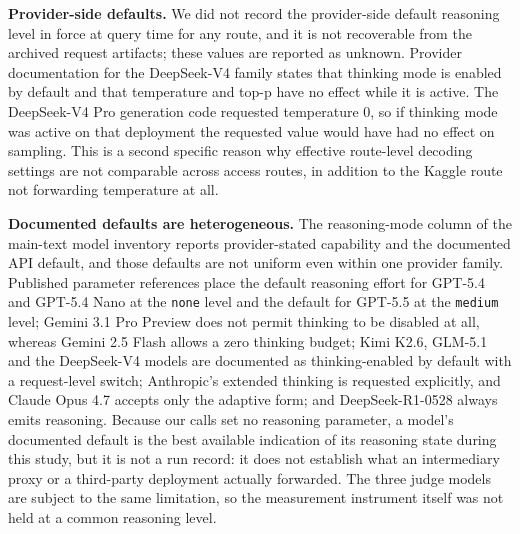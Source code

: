 \documentclass[10pt]{article}
\begin{document}
\textbf{Provider-side defaults.} We did not record the provider-side default reasoning
level in force at query time for any route, and it is not recoverable from the archived
request artifacts; these values are reported as unknown. Provider documentation for the
DeepSeek-V4 family states that thinking mode is enabled by default and that temperature
and top-p have no effect while it is active. The DeepSeek-V4 Pro generation code
requested temperature 0, so if thinking mode was active on that deployment the requested
value would have had no effect on sampling. This is a second specific reason why
effective route-level decoding settings are not comparable across access routes, in
addition to the Kaggle route not forwarding temperature at all.

\textbf{Documented defaults are heterogeneous.} The reasoning-mode column of the main-text
model inventory reports provider-stated capability and the documented API default, and
those defaults are not uniform even within one provider family. Published parameter
references place the default reasoning effort for GPT-5.4 and GPT-5.4 Nano at the
\texttt{none} level and the default for GPT-5.5 at the \texttt{medium} level; Gemini 3.1
Pro Preview does not permit thinking to be disabled at all, whereas Gemini 2.5 Flash
allows a zero thinking budget; Kimi K2.6, GLM-5.1 and the DeepSeek-V4 models are
documented as thinking-enabled by default with a request-level switch; Anthropic's
extended thinking is requested explicitly, and Claude Opus 4.7 accepts only the adaptive
form; and DeepSeek-R1-0528 always emits reasoning. Because our calls set no reasoning
parameter, a model's documented default is the best available indication of its reasoning
state during this study, but it is not a run record: it does not establish what an
intermediary proxy or a third-party deployment actually forwarded. The three judge models
are subject to the same limitation, so the measurement instrument itself was not held at a
common reasoning level.
\end{document}
